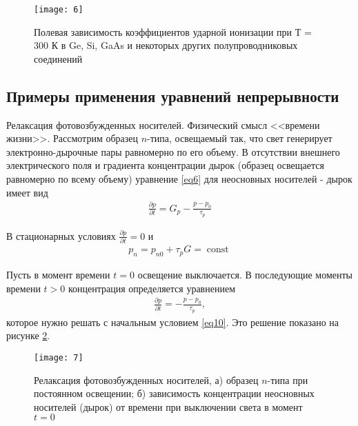 \documentclass[a4paper,12pt]{article}
\DeclareMathOperator{\const}{const}
\begin{document}
\begin{figure}[H]
	\centering
	\texttt{[image: 6]}
	\caption{Полевая зависимость коэффициентов ударной ионизации при Т = 300 К в Ge, Si, GaAs и некоторых других полупроводниковых соединений}
	\label{fig:figure5}
\end{figure}



\subsection{Примеры применения уравнений непрерывности}

Релаксация фотовозбужденных носителей. Физический смысл <<времени жизни>>. Рассмотрим образец $n$-типа, освещаемый так, что свет генерирует электронно-дырочные пары равномерно по его объему. В отсутствии внешнего электрического поля и градиента концентрации дырок (образец освещается равномерно по всему объему) уравнение \eqref{eq6} для неосновных носителей - дырок имеет вид
\begin{gather}
	\label{eq9}
	\frac{\partial p}{\partial t}=G_{p}-\frac{p-p_{0}}{\tau_{p}}
\end{gather}

В стационарных условиях $\frac{\partial p}{\partial t}=0$ и
\begin{gather}
	\label{eq10}
	p_{n}=p_{n 0}+\tau_{p} G=\const
\end{gather}

Пусть в момент времени $t = 0$ освещение выключается. В последующие моменты времени $t > 0$ концентрация определяется уравнением
\begin{gather}
	\label{eq11}
	\frac{\partial p}{\partial t}=-\frac{p-p_{0}}{\tau_{p}},
\end{gather}
которое нужно решать с начальным условием \eqref{eq10}. Это решение показано на рисунке \ref{fig:figure6}.

\begin{figure}[H]
	\centering
	\texttt{[image: 7]}
	\caption{Релаксация фотовозбужденных носителей, а) образец $n$-типа при постоянном освещении; б) зависимость концентрации неосновных носителей (дырок) от времени при выключении света в момент $t = 0$}
	\label{fig:figure6}
\end{figure}
\end{document}
